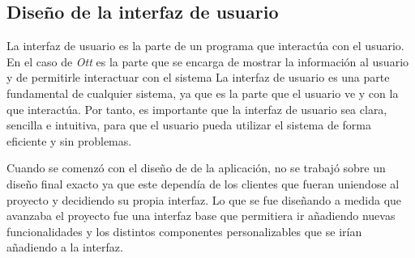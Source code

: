
\subsection{Diseño de la interfaz de usuario}
\label{sec:diseno-ux-diseno}
La interfaz de usuario es la parte de un programa que interactúa con el usuario. En el caso de \textit{Ott} 
es la parte que se encarga de mostrar la información al usuario y de permitirle interactuar con el sistema
La interfaz de usuario es una parte fundamental de cualquier sistema, ya que es la parte que el usuario ve 
y con la que interactúa. Por tanto, es importante que la interfaz de usuario sea clara, sencilla e intuitiva, 
para que el usuario pueda utilizar el sistema de forma eficiente y sin problemas.

Cuando se comenzó con el diseño de de la aplicación, no se trabajó sobre un diseño final exacto ya que este
dependía de los clientes que fueran uniendose al proyecto y decidiendo su propia interfaz. Lo que se fue diseñando
a medida que avanzaba el proyecto fue una interfaz base que permitiera ir añadiendo nuevas funcionalidades y 
los distintos componentes personalizables que se irían añadiendo a la interfaz. 


